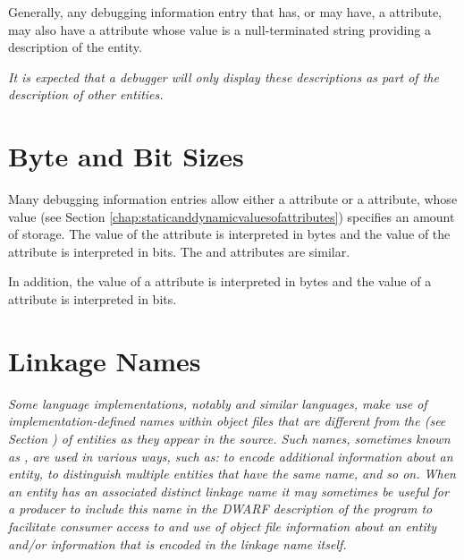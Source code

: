 Generally, any debugging information entry that 
has,\hypertarget{chap:DWATdescriptionartificialnameordescription}{}
or may have, a \DWATname{} attribute, may also have a
\DWATdescriptionDEFN{} attribute whose value is a
null-terminated string providing a description of the entity.

\textit{It is expected that a debugger will only display these
descriptions as part of the description of other entities.}

\section{Byte and Bit Sizes}
\label{chap:byteandbitsizes}
Many debugging information entries allow either a
\DWATbytesizeNAME{} attribute or a 
\DWATbitsizeNAME{} attribute,
whose  value 
(see Section \ref{chap:staticanddynamicvaluesofattributes}) 
specifies an
amount of storage. The value of the 
\DWATbytesizeDEFN{} attribute
is interpreted in bytes and the value of the 
\DWATbitsizeDEFN{}
attribute is interpreted in bits. The
\DWATstringlengthbytesize{} and 
\DWATstringlengthbitsize{} 
attributes are similar.

In addition, the 
value of a \DWATbytestride{} attribute is interpreted
in bytes and the  value of a 
\DWATbitstride{}
attribute is interpreted in bits.

\section{Linkage Names}
\label{chap:linkagenames}
\textit{Some language implementations, notably 
 and similar
languages, make use of implementation-defined names within
object files that are different from the 
(see Section ) of entities as they 
appear in the source. Such names, sometimes known as 
,
are used in various ways, such as: to encode additional
information about an entity, to distinguish multiple entities
that have the same name, and so on. When an entity has an
associated distinct linkage name it may sometimes be useful
for a producer to include this name in the DWARF description
of the program to facilitate consumer access to and use of
object file information about an entity and/or information
that is encoded in the linkage name itself.  
}

